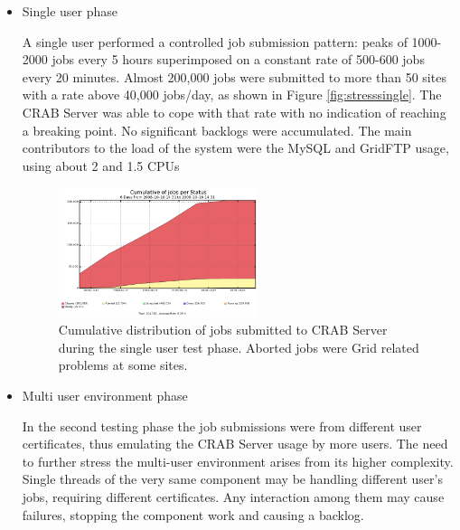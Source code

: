\begin{itemize}
\item{   Single user phase}

A single user performed a controlled job submission pattern: peaks of
1000-2000 jobs every 5 hours superimposed on a constant rate of
500-600 jobs every 20 minutes. Almost 200,000 jobs were submitted to
more than 50 sites with a rate above 40,000 jobs/day, as shown in
Figure \ref{fig:stresssingle}. The CRAB Server was able to cope with that
rate with no indication of reaching a breaking point. No significant
backlogs were accumulated. The main contributors to the load of the
system were the MySQL and GridFTP usage, using about 2 and 1.5 CPUs
\begin{figure}
\includegraphics[width=0.55\textwidth]{figures/SingleUserJobStatus.png}
\caption{Cumulative distribution of jobs submitted to CRAB Server
  during the single user test phase. Aborted jobs were Grid related
  problems at some sites. }
\label{stresssingle}
\end{figure}

\item{    Multi user environment phase}

In the second testing phase the job submissions were from different
user certificates, thus emulating the CRAB Server usage by more
users. The need to further stress the multi-user environment arises
from its higher complexity. Single threads of the very same component
may be handling different user's jobs, requiring different
certificates. Any interaction among them may cause failures, stopping
the component work and causing a backlog.


\end{itemize}

